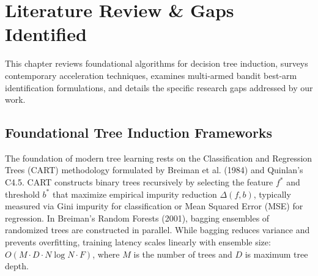 \documentclass{article}
\begin{document}
	\pagebreak
    
	\section{Literature Review \& Gaps Identified}
	This chapter reviews foundational algorithms for decision tree induction, surveys contemporary acceleration techniques, examines multi-armed bandit best-arm identification formulations, and details the specific research gaps addressed by our work.

	\subsection{Foundational Tree Induction Frameworks}
	The foundation of modern tree learning rests on the Classification and Regression Trees (CART) methodology formulated by Breiman et al. (1984) and Quinlan's C4.5. CART constructs binary trees recursively by selecting the feature $f^*$ and threshold $b^*$ that maximize empirical impurity reduction $\Delta(f, b)$, typically measured via Gini impurity for classification or Mean Squared Error (MSE) for regression. In Breiman's Random Forests (2001), bagging ensembles of randomized trees are constructed in parallel. While bagging reduces variance and prevents overfitting, training latency scales linearly with ensemble size: $O(M \cdot D \cdot N \log N \cdot F)$, where $M$ is the number of trees and $D$ is maximum tree depth.
\end{document}
